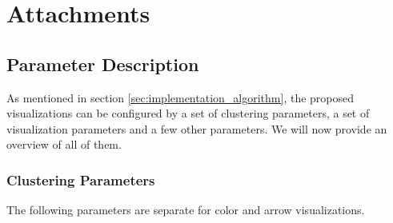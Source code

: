 \chapter{Attachments}

\section{Parameter Description}
\label{sec:parameter_description}

As mentioned in section \ref{sec:implementation_algorithm}, the proposed visualizations can be configured by a set of clustering parameters, a set of visualization parameters and a few other parameters. We will now provide an overview of all of them.

\subsection{Clustering Parameters}
\label{sec:clustering_parameters}

The following parameters are separate for color and arrow visualizations.

